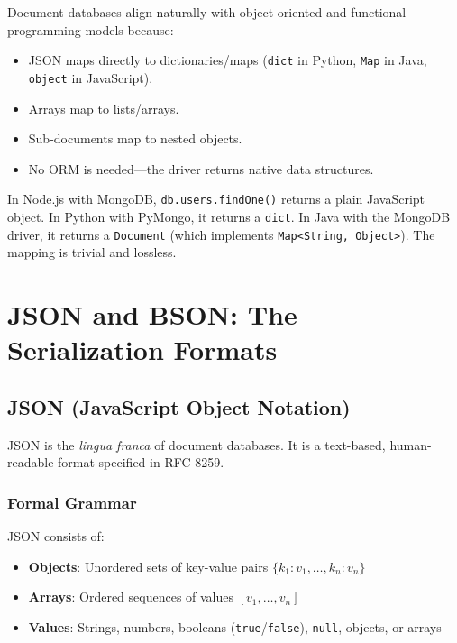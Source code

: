 \documentclass[12pt,a4paper]{article}
\begin{document}
Document databases align naturally with object-oriented and functional programming models because:
\begin{itemize}[noitemsep]
    \item JSON maps directly to dictionaries/maps (\texttt{dict} in Python, \texttt{Map} in Java, \texttt{object} in JavaScript).
    \item Arrays map to lists/arrays.
    \item Sub-documents map to nested objects.
    \item No ORM is needed---the driver returns native data structures.
\end{itemize}

\begin{tip}
In Node.js with MongoDB, \texttt{db.users.findOne()} returns a plain JavaScript object. In Python with PyMongo, it returns a \texttt{dict}. In Java with the MongoDB driver, it returns a \texttt{Document} (which implements \texttt{Map<String, Object>}). The mapping is trivial and lossless.
\end{tip}

\section{JSON and BSON: The Serialization Formats}

\subsection{JSON (JavaScript Object Notation)}

JSON is the \textit{lingua franca} of document databases. It is a text-based, human-readable format specified in RFC 8259.

\subsubsection{Formal Grammar}

JSON consists of:
\begin{itemize}[noitemsep]
    \item \textbf{Objects}: Unordered sets of key-value pairs $\{k_1: v_1, \dots, k_n: v_n\}$
    \item \textbf{Arrays}: Ordered sequences of values $[v_1, \dots, v_n]$
    \item \textbf{Values}: Strings, numbers, booleans (\texttt{true}/\texttt{false}), \texttt{null}, objects, or arrays
\end{itemize}
\end{document}
